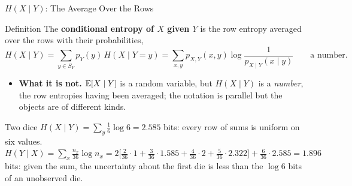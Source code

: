 \begin{frame}{$H(X\mid Y)$: The Average Over the Rows}
  \small
  \begin{block}{Definition}
    The \textbf{conditional entropy of $X$ given $Y$} is the row entropy averaged over the rows with their probabilities,
    \[
      H(X\mid Y)=\sum_{y\in S_Y}p_Y(y)\,H(X\mid Y=y)=\sum_{x,y}p_{X,Y}(x,y)\log\frac1{p_{X\mid Y}(x\mid y)}\qquad\text{a number.}
    \]
  \end{block}
  \begin{itemize}
    \item \textbf{What it is not.} $\mathbb{E}[X\mid Y]$ is a random variable, but $H(X\mid Y)$ is a \emph{number}, the row entropies having been averaged; the notation is parallel but the objects are of different kinds.
  \end{itemize}
  \begin{exampleblock}{Two dice}
    $H(X\mid Y)=\sum_y\tfrac16\log6=2.585$ bits: every row of sums is uniform on six values. \\
    $H(Y\mid X)=\sum_{x}\frac{n_x}{36}\log n_x=2\big[\tfrac2{36}\cdot1+\tfrac3{36}\cdot1.585+\tfrac4{36}\cdot2+\tfrac5{36}\cdot2.322\big]+\tfrac6{36}\cdot2.585=1.896$ bits: given the sum, the uncertainty about the first die is less than the $\log6$ bits of an unobserved die.
  \end{exampleblock}
\end{frame}

